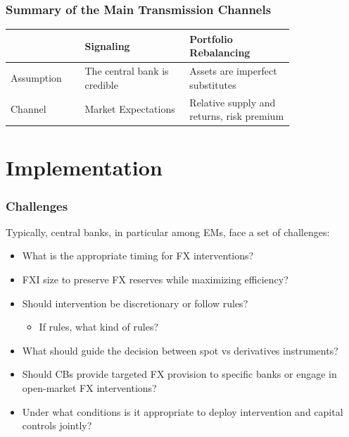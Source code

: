 \documentclass{beamer}
\begin{document}
\begin{frame}
  \frametitle{Summary of the Main Transmission Channels}

\begin{tabular}{p{0.2\linewidth}|p{0.3\linewidth}| p{0.3\linewidth}}
\hline
     &  Signaling  &  Portfolio Rebalancing \\ 
\hline
    Assumption &  The central bank is credible &  Assets are imperfect substitutes \\ 
\hline
    Channel & Market Expectations & Relative supply and returns, risk premium \\ 
\hline
\end{tabular}
\end{frame}


\section{Implementation}

\begin{frame}
  \frametitle{Challenges}

  Typically, central banks, in particular among EMs, face a set of challenges:
  \begin{itemize}
    \item What is the appropriate timing for FX interventions?   
    \item FXI size to preserve FX reserves while maximizing efficiency?
    \item Should intervention be discretionary or follow rules?
      \begin{itemize}
      \item If rules, what kind of rules?
      \end{itemize}
  \item What should guide the decision between spot vs derivatives instruments?
  \item Should CBs provide targeted FX provision to specific banks or engage in open-market FX interventions?
  \item Under what conditions is it appropriate to deploy intervention and capital controls jointly?
  \end{itemize}
\end{frame}
\end{document}

